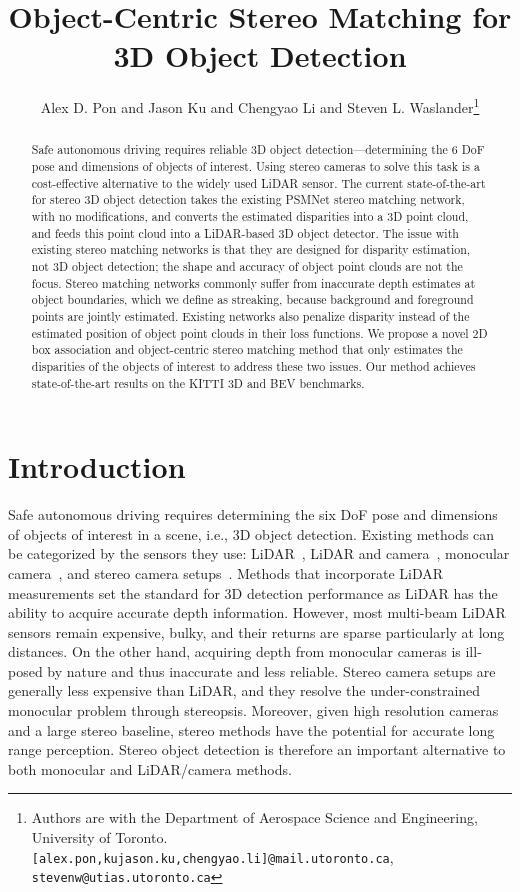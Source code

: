 \documentclass[letterpaper, 10 pt, conference]{ieeeconf}
\title{\LARGE \bf
Object-Centric Stereo Matching for 3D Object Detection
}
\author{Alex D. Pon and Jason Ku and Chengyao Li and Steven L. Waslander\thanks{Authors are with the Department of Aerospace Science and Engineering, University of Toronto. {\tt\scriptsize[alex.pon,kujason.ku,chengyao.li]@mail.utoronto.ca}, \tt\scriptsize{stevenw@utias.utoronto.ca}}}
\begin{document}
\maketitle
\thispagestyle{empty}
\pagestyle{empty}


\begin{abstract}

Safe autonomous driving requires reliable 3D object detection---determining the 6 DoF pose and dimensions of objects of interest. Using stereo cameras to solve this task is a cost-effective alternative to the widely used LiDAR sensor. The current state-of-the-art for stereo 3D object detection takes the existing PSMNet stereo matching network, with no modifications, and converts the estimated disparities into a 3D point cloud, and feeds this point cloud into a LiDAR-based 3D object detector. The issue with existing stereo matching networks is that they are designed for disparity estimation, not 3D object detection; the shape and accuracy of object point clouds are not the focus. Stereo matching networks commonly suffer from inaccurate depth estimates at object boundaries, which we define as streaking, because background and foreground points are jointly estimated. Existing networks also penalize disparity instead of the estimated position of object point clouds in their loss functions. We propose a novel 2D box association and object-centric stereo matching method that only estimates the disparities of the objects of interest to address these two issues. Our method achieves state-of-the-art results on the KITTI 3D and BEV benchmarks.

\end{abstract}


\section{Introduction}

Safe autonomous driving requires determining the six DoF pose and dimensions of objects of interest in a scene, i.e., 3D object detection. Existing methods can be categorized by the sensors they use: LiDAR~\cite{zhou2018voxelnet, yan2018second, shi2019pointrcnn, meyer2019lasernet, lang2019pointpillars}, LiDAR and camera~\cite{qi_fpointnet, ku_avod, liang2019multi}, monocular camera~\cite{ku2019monopsr, manhardt2019roi, qin2018monogrnet}, and stereo camera setups~\cite{li2019stereo_rcnn, wang2018pseudo, qin2019triangulation, chen20173d}. Methods that incorporate LiDAR measurements set the standard for 3D detection performance as LiDAR has the ability to acquire accurate depth information. However, most multi-beam LiDAR sensors remain expensive, bulky, and their returns are sparse particularly at long distances. On the other hand, acquiring depth from monocular cameras is ill-posed by nature and thus inaccurate and less reliable. Stereo camera setups are generally less expensive than LiDAR, and they resolve the under-constrained monocular problem through stereopsis. Moreover, given high resolution cameras and a large stereo baseline, stereo methods have the potential for accurate long range perception. Stereo object detection is therefore an important alternative to both monocular and LiDAR/camera methods.
\end{document}
